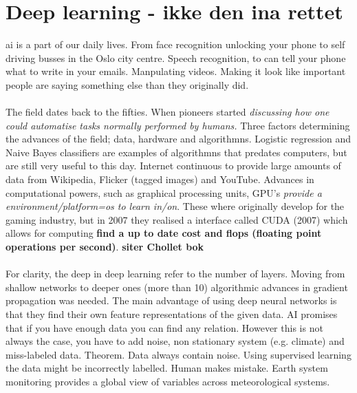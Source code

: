 \section{Deep learning - ikke den ina rettet}
\acrfull{ai} is a part of our daily lives. From face recognition unlocking your phone to self driving busses in the Oslo city centre. Speech recognition, to can tell your phone what to write in your emails. Manpulating videos. Making it look like important people are saying something else than they originally did. \\ \\
The field dates back to the fifties. When pioneers started\textit{ discussing how one could automatise tasks normally performed by humans.} Three factors determining the advances of the field; data, hardware and algorithmns. Logistic regression and Naive Bayes classifiers are examples of algorithmns that predates computers, but are still very useful to this day. Internet continuous to provide large amounts of data from Wikipedia, Flicker (tagged images) and YouTube. Advances in computational powers, such as graphical processing units, GPU's \textit{provide a environment/platform=os to learn in/on}. These where originally develop for the gaming industry, but in 2007 they realised a interface called CUDA (2007) which allows for computing \textbf{find a up to date cost and flops (floating point operations per second)}. \textbf{siter Chollet bok}
\\ \\ 
For clarity, the deep in deep learning refer to the number of layers. Moving from shallow networks to deeper ones (more than 10) algorithmic advances in gradient propagation was needed. The main advantage of using deep neural networks is that they find their own feature representations of the given data. AI promises that if you have enough data you can find any relation. However this is not always the case, you have to add noise, non stationary system (e.g. climate) and miss-labeled data. Theorem. Data always contain noise. Using supervised learning the data might be incorrectly labelled. Human makes mistake. Earth system monitoring provides a global view of variables across meteorological systems. %
